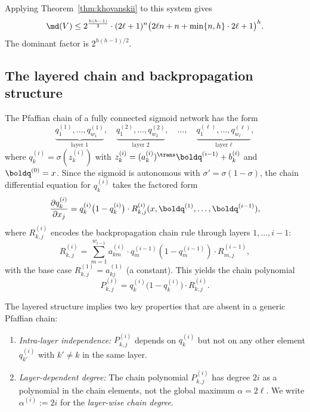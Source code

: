 Applying Theorem~\ref{thm:khovanskii} to this system gives
\begin{equation}\label{eq:generic-gauss-bound}
  \md(V) \leq 2^{\frac{h(h-1)}{2}} \cdot (2\ell + 1)^n \bigl(2\ell n + n + \min\{n, h\} \cdot 2\ell + 1\bigr)^h.
\end{equation}
The dominant factor is $2^{h(h-1)/2}$.

\subsection{The layered chain and backpropagation structure}\label{subsec:layered-chain}

The Pfaffian chain of a fully connected sigmoid network has the form
\begin{equation}\label{eq:layered-chain}
  \underbrace{q_1^{(1)}, \ldots, q_{w_1}^{(1)}}_{\text{layer 1}}, \quad
  \underbrace{q_1^{(2)}, \ldots, q_{w_2}^{(2)}}_{\text{layer 2}}, \quad \ldots, \quad
  \underbrace{q_1^{(\ell)}, \ldots, q_{w_\ell}^{(\ell)}}_{\text{layer $\ell$}},
\end{equation}
where $q_k^{(i)} = \sigma(z_k^{(i)})$ with $z_k^{(i)} = (a_k^{(i)})^\trans \boldq^{(i-1)} + b_k^{(i)}$ and $\boldq^{(0)} = x$. Since the sigmoid is autonomous with $\sigma' = \sigma(1-\sigma)$, the chain differential equation for $q_k^{(i)}$ takes the factored form
\begin{equation}\label{eq:chain-poly-factored}
  \frac{\partial q_k^{(i)}}{\partial x_j}
  = q_k^{(i)}\bigl(1 - q_k^{(i)}\bigr) \cdot R_{k,j}^{(i)}(x, \boldq^{(1)}, \ldots, \boldq^{(i-1)}),
\end{equation}
where $R_{k,j}^{(i)}$ encodes the backpropagation chain rule through layers $1, \ldots, i-1$:
\begin{equation}\label{eq:backprop-Rkj}
  R_{k,j}^{(i)} = \sum_{m=1}^{w_{i-1}} a_{km}^{(i)} \cdot q_m^{(i-1)}(1-q_m^{(i-1)}) \cdot R_{m,j}^{(i-1)},
\end{equation}
with the base case $R_{k,j}^{(1)} = a_{kj}^{(1)}$ (a constant). This yields the chain polynomial
\begin{equation}\label{eq:Pkj-factored}
  P_{k,j}^{(i)} = q_k^{(i)}\bigl(1 - q_k^{(i)}\bigr) \cdot R_{k,j}^{(i)}.
\end{equation}

The layered structure implies two key properties that are absent in a generic Pfaffian chain:
\begin{enumerate}
  \item[\textbf{(IL)}] \emph{Intra-layer independence:} $P_{k,j}^{(i)}$ depends on $q_k^{(i)}$ but not on any other element $q_{k'}^{(i)}$ with $k' \neq k$ in the same layer.
  \item[\textbf{(LD)}] \emph{Layer-dependent degree:} The chain polynomial $P_{k,j}^{(i)}$ has degree $2i$ as a polynomial in the chain elements, not the global maximum $\alpha = 2\ell$. We write $\alpha^{(i)} := 2i$ for the \emph{layer-wise chain degree}.
\end{enumerate}

